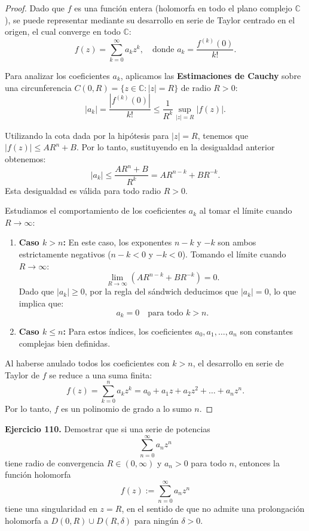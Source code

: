\documentclass[11pt,a4paper]{article}
\theoremstyle{definition}
\theoremstyle{plain}
\theoremstyle{remark}
\begin{document}
	\begin{proof}
		Dado que $f$ es una función entera (holomorfa en todo el plano complejo $\mathbb{C}$), se puede representar mediante su desarrollo en serie de Taylor centrado en el origen, el cual converge en todo $\mathbb{C}$:
		\[
		f(z) = \sum_{k=0}^{\infty} a_k z^k, \quad \text{donde } a_k = \frac{f^{(k)}(0)}{k!}.
		\]
		
		Para analizar los coeficientes $a_k$, aplicamos las \textbf{Estimaciones de Cauchy} sobre una circunferencia $C(0, R) = \{ z \in \mathbb{C} : |z| = R \}$ de radio $R > 0$:
		\[
		|a_k| = \frac{|f^{(k)}(0)|}{k!} \le \frac{1}{R^k} \sup_{|z|=R} |f(z)|.
		\]
		
		Utilizando la cota dada por la hipótesis para $|z| = R$, tenemos que $|f(z)| \le A R^n + B$. Por lo tanto, sustituyendo en la desigualdad anterior obtenemos:
		\[
		|a_k| \le \frac{A R^n + B}{R^k} = A R^{n-k} + B R^{-k}.
		\]
		Esta desigualdad es válida para todo radio $R > 0$.
		
		Estudiamos el comportamiento de los coeficientes $a_k$ al tomar el límite cuando $R \to \infty$:
		
		\begin{enumerate}
			\item \textbf{Caso $k > n$:} En este caso, los exponentes $n - k$ y $-k$ son ambos estrictamente negativos ($n - k < 0$ y $-k < 0$). Tomando el límite cuando $R \to \infty$:
			\[
			\lim_{R \to \infty} \left( A R^{n-k} + B R^{-k} \right) = 0.
			\]
			Dado que $|a_k| \ge 0$, por la regla del sándwich deducimos que $|a_k| = 0$, lo que implica que:
			\[
			a_k = 0 \quad \text{para todo } k > n.
			\]
			
			\item \textbf{Caso $k \le n$:} Para estos índices, los coeficientes $a_0, a_1, \dots, a_n$ son constantes complejas bien definidas.
		\end{enumerate}
		
		Al haberse anulado todos los coeficientes con $k > n$, el desarrollo en serie de Taylor de $f$ se reduce a una suma finita:
		\[
		f(z) = \sum_{k=0}^{n} a_k z^k = a_0 + a_1 z + a_2 z^2 + \dots + a_n z^n.
		\]
		Por lo tanto, $f$ es un polinomio de grado a lo sumo $n$.
	\end{proof}
	\textbf{Ejercicio 110.} Demostrar que si una serie de potencias
	\[
	\sum_{n=0}^{\infty}a_nz^n
	\]
	tiene radio de convergencia \(R\in(0,\infty)\) y \(a_n>0\) para todo \(n\), entonces la función holomorfa
	\[
	f(z):=\sum_{n=0}^{\infty}a_nz^n
	\]
	tiene una singularidad en \(z=R\), en el sentido de que no admite una prolongación holomorfa a \(D(0,R)\cup D(R,\delta)\) para ningún \(\delta>0\).
	
\end{document}
